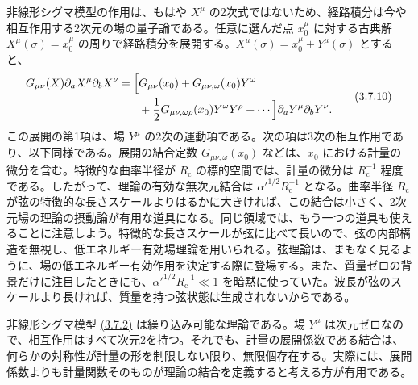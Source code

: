 非線形シグマ模型の作用は、もはや $X^\mu$ の2次式ではないため、経路積分は今や相互作用する2次元の場の量子論である。任意に選んだ点 $x_0^\mu$ に対する古典解 $X^\mu(\sigma)=x_0^\mu$ の周りで経路積分を展開する。$X^\mu(\sigma)=x_0^\mu+Y^\mu(\sigma)$ とすると、
\begin{equation}
\begin{aligned}
G_{\mu\nu}(X)\partial_aX^\mu\partial_bX^\nu
=\Bigl[&G_{\mu\nu}(x_0)+G_{\mu\nu,\omega}(x_0)Y^\omega\\
&+\frac12G_{\mu\nu,\omega\rho}(x_0)Y^\omega Y^\rho+\cdots\Bigr]
\partial_aY^\mu\partial_bY^\nu.
\end{aligned}
\tag{3.7.10}\label{eq:3.7.10}
\end{equation}
この展開の第1項は、場 $Y^\mu$ の2次の運動項である。次の項は3次の相互作用であり、以下同様である。展開の結合定数 $G_{\mu\nu,\omega}(x_0)$ などは、$x_0$ における計量の微分を含む。特徴的な曲率半径が $R_{\mathrm c}$ の標的空間では、計量の微分は $R_{\mathrm c}^{-1}$ 程度である。したがって、理論の有効な無次元結合は $\alpha'^{1/2}R_{\mathrm c}^{-1}$ となる。曲率半径 $R_{\mathrm c}$ が弦の特徴的な長さスケールよりはるかに大きければ、この結合は小さく、2次元場の理論の摂動論が有用な道具になる。同じ領域では、もう一つの道具も使えることに注意しよう。特徴的な長さスケールが弦に比べて長いので、弦の内部構造を無視し、低エネルギー有効場理論を用いられる。弦理論は、まもなく見るように、場の低エネルギー有効作用を決定する際に登場する。また、質量ゼロの背景だけに注目したときにも、$\alpha'^{1/2}R_{\mathrm c}^{-1}\ll1$ を暗黙に使っていた。波長が弦のスケールより長ければ、質量を持つ弦状態は生成されないからである。

非線形シグマ模型 \hyperref[eq:3.7.2]{(3.7.2)} は繰り込み可能な理論である。場 $Y^\mu$ は次元ゼロなので、相互作用はすべて次元2を持つ。それでも、計量の展開係数である結合は、何らかの対称性が計量の形を制限しない限り、無限個存在する。実際には、展開係数よりも計量関数そのものが理論の結合を定義すると考える方が有用である。



